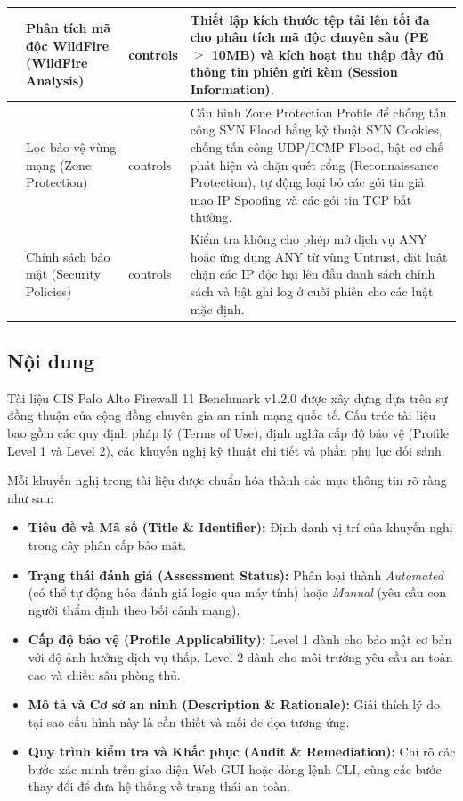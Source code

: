 \documentclass[12pt,a4paper]{article}
\begin{document}
\begin{longtable}{|>{\centering\arraybackslash}p{1.2cm}|>{\raggedright\arraybackslash}p{3.6cm}|>{\centering\arraybackslash}p{2.0cm}|>{\raggedright\arraybackslash}p{7.4cm}|}
6 & Phân tích mã độc WildFire (WildFire Analysis) & 2 controls & Thiết lập kích thước tệp tải lên tối đa cho phân tích mã độc chuyên sâu (PE $\geq$ 10MB) và kích hoạt thu thập đầy đủ thông tin phiên gửi kèm (Session Information). \\ \hline
7 & Lọc bảo vệ vùng mạng (Zone Protection) & 4 controls & Cấu hình Zone Protection Profile để chống tấn công SYN Flood bằng kỹ thuật SYN Cookies, chống tấn công UDP/ICMP Flood, bật cơ chế phát hiện và chặn quét cổng (Reconnaissance Protection), tự động loại bỏ các gói tin giả mạo IP Spoofing và các gói tin TCP bất thường. \\ \hline
8 & Chính sách bảo mật (Security Policies) & 4 controls & Kiểm tra không cho phép mở dịch vụ ANY hoặc ứng dụng ANY từ vùng Untrust, đặt luật chặn các IP độc hại lên đầu danh sách chính sách và bật ghi log ở cuối phiên cho các luật mặc định. \\ \hline
\end{longtable}
\endgroup

\subsection{Nội dung}
\noindent Tài liệu CIS Palo Alto Firewall 11 Benchmark v1.2.0 được xây dựng dựa trên sự đồng thuận của cộng đồng chuyên gia an ninh mạng quốc tế. Cấu trúc tài liệu bao gồm các quy định pháp lý (Terms of Use), định nghĩa cấp độ bảo vệ (Profile Level 1 và Level 2), các khuyến nghị kỹ thuật chi tiết và phần phụ lục đối sánh.

\vspace{0.3cm}

\noindent Mỗi khuyến nghị trong tài liệu được chuẩn hóa thành các mục thông tin rõ ràng như sau:
\begin{itemize}
    \item \textbf{Tiêu đề và Mã số (Title \& Identifier):} Định danh vị trí của khuyến nghị trong cây phân cấp bảo mật.
    \item \textbf{Trạng thái đánh giá (Assessment Status):} Phân loại thành \textit{Automated} (có thể tự động hóa đánh giá logic qua máy tính) hoặc \textit{Manual} (yêu cầu con người thẩm định theo bối cảnh mạng).
    \item \textbf{Cấp độ bảo vệ (Profile Applicability):} Level 1 dành cho bảo mật cơ bản với độ ảnh hưởng dịch vụ thấp, Level 2 dành cho môi trường yêu cầu an toàn cao và chiều sâu phòng thủ.
    \item \textbf{Mô tả và Cơ sở an ninh (Description \& Rationale):} Giải thích lý do tại sao cấu hình này là cần thiết và mối đe dọa tương ứng.
    \item \textbf{Quy trình kiểm tra và Khắc phục (Audit \& Remediation):} Chỉ rõ các bước xác minh trên giao diện Web GUI hoặc dòng lệnh CLI, cùng các bước thay đổi để đưa hệ thống về trạng thái an toàn.
\end{itemize}
\end{document}

